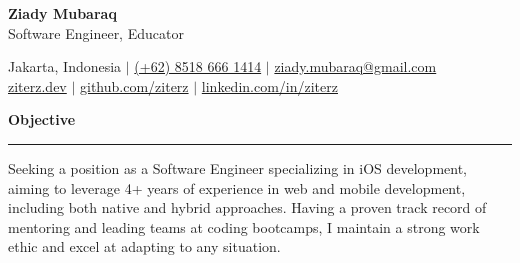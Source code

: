 \documentclass{article}
\newcommand{\header}[1]{
	\vspace{4mm}
	{\large \noindent \textbf{#1}}
	\vspace{1mm}
	\hrule
	\vspace{2mm}
}
\begin{document}
	\begin{flushleft}
		{\LARGE \textbf{Ziady Mubaraq}} \\
		{\large Software Engineer, Educator}

		\vspace{1mm}
		
		Jakarta, Indonesia  $\mid$ \href{https://wa.me/6285186661414}{(+62) 8518 666 1414} $\mid$ \href{mailto:ziady.mubaraq@gmail.com}{ziady.mubaraq@gmail.com} \\
		\href{https://ziterz.dev}{ziterz.dev}  $\mid$ \href{https://github.com/ziterz}{github.com/ziterz} $\mid$ \href{https://linkedin.com/in/ziterz}{linkedin.com/in/ziterz}        
	\end{flushleft}

	\vspace{-3mm}

	\header{Objective}
		Seeking a position as a Software Engineer specializing in iOS development, aiming to leverage 4+ years of experience in web and mobile development, including both native and hybrid approaches. Having a proven track record of mentoring and leading teams at coding bootcamps, I maintain a strong work ethic and excel at adapting to any situation.
		\vspace{1mm}

	\setlength{\columnsep}{1.5em}
\end{document}
